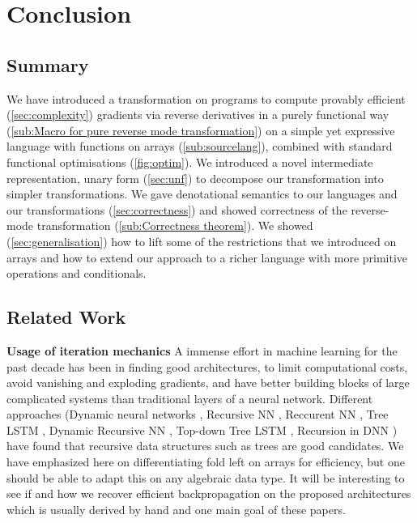\section{Conclusion}
\label{sec:conclusion}

\subsection{Summary} %
\label{sub:summary}

We have introduced a transformation on programs to compute provably efficient (\ref{sec:complexity}) 
gradients via reverse derivatives in a purely functional way (\ref{sub:Macro for pure reverse mode transformation})
on a simple yet expressive language with functions on arrays (\ref{sub:sourcelang}), 
combined with standard functional optimisations (\ref{fig:optim}).  
We introduced a novel intermediate representation, unary form (\ref{sec:unf}) 
to decompose our transformation into simpler transformations.
We gave denotational semantics to our languages and our transformations (\ref{sec:correctness}) 
and showed correctness of the reverse-mode transformation (\ref{sub:Correctness theorem}).
We showed (\ref{sec:generalisation}) how to lift some of the restrictions that
we introduced on arrays and how to extend our approach to a richer language with more primitive operations and conditionals.

\subsection{Related Work} %
\label{sub:related_work}

\noindent \textbf{Usage of iteration mechanics}
A immense effort in machine learning for the past decade has been in finding
good architectures, to limit computational costs, 
avoid vanishing and exploding gradients, 
and have better building blocks of large complicated systems than traditional layers of a neural network.
Different approaches 
(Dynamic neural networks \cite{jin2017manipulability,wu2016deep}, 
Recursive NN \cite{socher2011parsing,biancofiore2017recursive}, 
Reccurent NN \cite{bahdanau2014neural,luong2015effective}, 
Tree LSTM \cite{tai2015improved,chen2016enhanced}, 
Dynamic Recursive NN \cite{guo2019dynamic}, 
Top-down Tree LSTM \cite{zhang2015top}, 
Recursion in DNN \cite{jeong2018improving}) 
have found that recursive data structures such as trees are good candidates.
We have emphasized here on differentiating fold left on arrays for efficiency, 
but one should be able to adapt this on any algebraic data type. 
It will be interesting to see if and how we recover efficient backpropagation on the proposed architectures 
which is usually derived by hand and one main goal of these papers.

